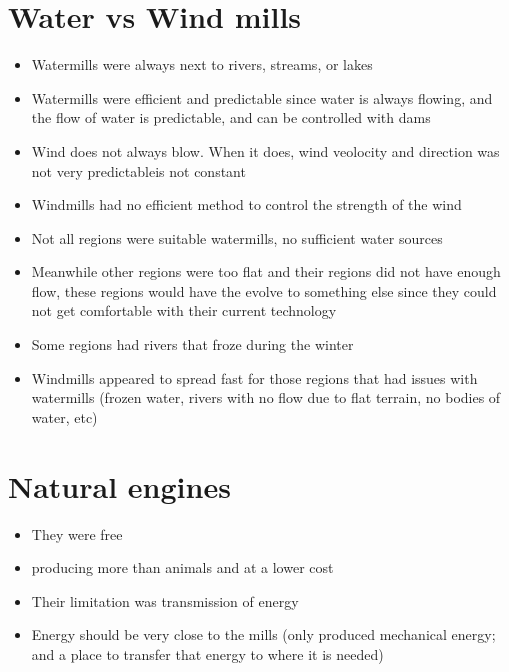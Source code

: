 \documentclass{article}
\begin{document}
\section*{Water vs Wind mills}
\begin{itemize}
  \item Watermills were always next to rivers, streams, or lakes
  \item Watermills were efficient and predictable
    since water is always flowing, and the flow of water
    is predictable, and can be controlled with dams
  \item Wind does not always blow. When it does, wind veolocity and direction
    was not very predictableis not constant
  \item Windmills had no efficient method to control the strength of the wind
  \item Not all regions were suitable watermills, no sufficient water sources
  \item Meanwhile other regions were too flat and their regions did not have enough flow,
    these regions would have the evolve to something else
    since they could not get comfortable with their current technology
  \item Some regions had rivers that froze during the winter
  \item Windmills appeared to spread fast for those regions that
    had issues with watermills (frozen water, rivers with no flow due to flat terrain, no bodies of water, etc)
\end{itemize}

\section*{Natural engines}
\begin{itemize}
  \item They were free
  \item producing more than animals and at a lower cost
  \item Their limitation was transmission of energy
  \item Energy should be very close to the mills (only produced mechanical energy;
    and a place to transfer that energy to where it is needed)
\end{itemize}
\end{document}
